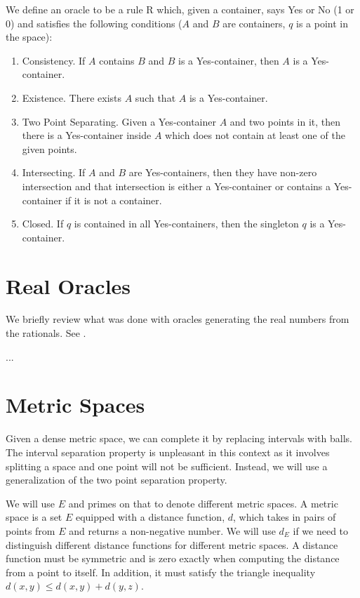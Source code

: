 \documentclass[12pt]{article}
\begin{document}
We define an oracle to be a rule R which, given a container, says Yes or No (1 or 0) and satisfies the following conditions ($A$ and $B$ are containers, $q$ is a point in the space): 
\begin{enumerate}
    \item Consistency. If $A$ contains $B$ and $B$ is a Yes-container, then $A$ is a Yes-container.
    \item Existence. There exists $A$ such that $A$ is a Yes-container.
    \item Two Point Separating. Given a Yes-container $A$ and two points in it, then there is a Yes-container inside $A$ which does not contain at least one of the given points. 
    \item Intersecting. If $A$ and $B$ are Yes-containers, then they have non-zero intersection and that intersection is either a Yes-container or contains a Yes-container if it is not a container. 
    \item Closed. If $q$ is contained in all Yes-containers, then the singleton $q$ is a Yes-container. 
\end{enumerate}


\section{Real Oracles}

We briefly review what was done with oracles generating the real numbers from the rationals. See \cite{taylor23main}.

...

\section{Metric Spaces}

Given a dense metric space, we can complete it by replacing intervals with balls. The interval separation property is unpleasant in this context as it involves splitting a space and one point will not be sufficient. Instead, we will use a generalization of the two point separation property. 

We will use $E$ and primes on that to denote different metric spaces. A metric space is a set $E$ equipped with a distance function, $d$, which takes in pairs of points from $E$ and returns a non-negative number. We will use $d_E$ if we need to distinguish different distance functions for different metric spaces. A distance function must be symmetric and is zero exactly when computing the distance from a point to itself. In addition, it must satisfy the triangle inequality $d(x,y) \leq d(x,y) + d(y,z)$. 
\end{document}
